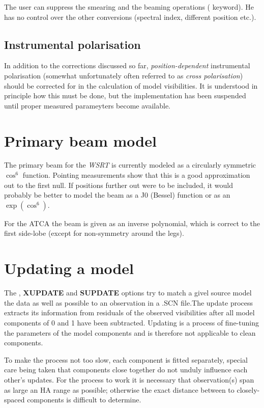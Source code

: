 	The user can suppress the smearing and the beaming operations
( keyword).  He has no control over the other
conversions (spectral index, different position etc.). 


\subsection{ Instrumental polarisation}
\label{.instr.pol}

	In addition to the corrections discussed so far, {\em
position-dependent} instrumental polarisation (somewhat unfortunately
often referred to as {\em cross polarisation}) should be corrected for
in the calculation of model visibilities.  It is understood in principle
how this must be done, but the implementation has been suspended until
proper measured parameyters become available. 


\section{ Primary beam model}
\label{.primary.beam}

	The primary beam for the {\em WSRT} is currently modeled as a
circularly symmetric $\cos^{6}$ function.  Pointing measurements show
that this is a good approximation out to the first null.  If positions
further out were to be included, it would probably be better to model
the beam as a J0 (Bessel) function or as an $\exp(\cos^{6})$. 

	For the ATCA the beam is given as an inverse polynomial, which
is correct to the first side-lobe (except for non-symmetry around the
legs). 

\section{ Updating a model}
\label{.update}

	The , {\bf XUPDATE} and {\bf SUPDATE}
options try to match a givel source model the data as well as possible
to an observation in a .SCN file.The update process extracts its
information from residuals of the observed visibilities after all model
components of  0 and 1 have been subtracted. 
Updating is a process of fine-tuning the parameters of the model
components and is therefore not applicable to clean components. 

	To make the process not too slow, each \source component is
fitted separately, special care being taken that components close
together do not unduly influence each other's updates.  For the process
to work it is necessary that observation(s) span as large an HA range as
possible; otherwise the exact distance between to closely-spaced
components is difficult to determine. 

